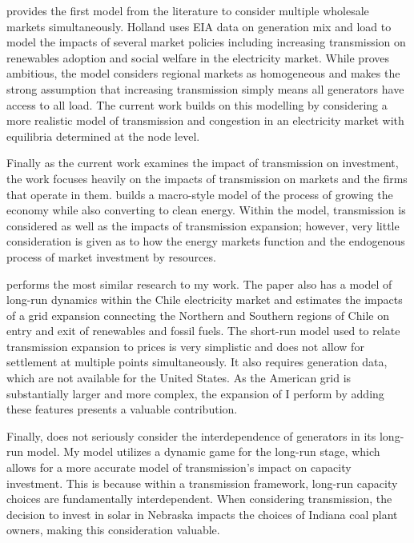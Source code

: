 \documentclass[12pt]{article}
\begin{document}
\cite{holland2022decarbonization} provides the first model from the literature to consider multiple wholesale markets simultaneously. Holland uses EIA data on generation mix and load to model the impacts of several market policies including increasing transmission on renewables adoption and social welfare in the electricity market. While \cite{holland2022decarbonization} proves ambitious, the model considers regional markets as homogeneous and makes the strong assumption that increasing transmission simply means all generators have access to all load. The current work builds on this modelling by considering a more realistic model of transmission and congestion in an electricity market with equilibria determined at the node level.

Finally as the current work examines the impact of transmission on investment, the work focuses heavily on the impacts of transmission on markets and the firms that operate in them. \cite{arkolakis2023clean} builds a macro-style model of the process of growing the economy while also converting to clean energy. Within the model, transmission is considered as well as the impacts of transmission expansion; however, very little consideration is given as to how the energy markets function and the endogenous process of market investment by resources.

\cite{gonzales2022dynamic} performs the most similar research to my work. The paper also has a model of long-run dynamics within the Chile electricity market and estimates the impacts of a grid expansion connecting the Northern and Southern regions of Chile on entry and exit of renewables and fossil fuels. The short-run model used to relate transmission expansion to prices is very simplistic and does not allow for settlement at multiple points simultaneously. It also requires generation data, which are not available for the United States. As the American grid is substantially larger and more complex, the expansion of \cite{gonzales2022dynamic} I perform by adding these features presents a valuable contribution. 

Finally, \cite{gonzales2022dynamic} does not seriously consider the interdependence of generators in its long-run model. My model utilizes a dynamic game for the long-run stage, which allows for a more accurate model of transmission's impact on capacity investment. This is because within a transmission framework, long-run capacity choices are fundamentally interdependent. When considering transmission, the decision to invest in solar in Nebraska impacts the choices of Indiana coal plant owners, making this consideration valuable.
\end{document}
